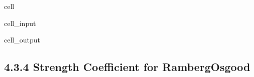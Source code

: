 \documentclass[letterpaper,10pt,english]{jupyterBook}
\begin{document}
\begin{sphinxuseclass}{cell}
\begin{sphinxVerbatimInput}
\begin{sphinxuseclass}{cell_input}
		\end{sphinxuseclass}\end{sphinxVerbatimInput}
		\begin{sphinxVerbatimOutput}
			
			\begin{sphinxuseclass}{cell_output}
				\noindent{}
				
		\end{sphinxuseclass}\end{sphinxVerbatimOutput}
		
	\end{sphinxuseclass}
	
	\subsection{4.3.4 Strength Coefficient for Ramberg\sphinxhyphen{}Osgood}
	\label{\detokenize{4 Mechanical Properties:strength-coefficient-for-ramberg-osgood}}
\end{document}
